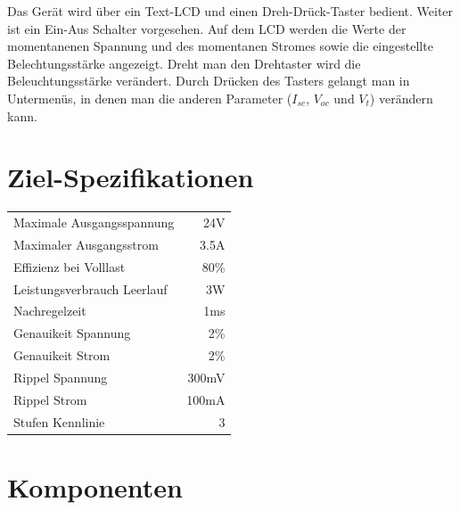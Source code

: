 \documentclass{article}
\begin{document}
Das   Ger\"at  wird   \"uber  ein   Text-LCD  und   einen  Dreh-Dr\"uck-Taster
bedient. Weiter  ist  ein  Ein-Aus  Schalter vorgesehen. Auf  dem  LCD  werden
die  Werte der  momentanenen Spannung  und  des momentanen  Stromes sowie  die
eingestellte Belechtungsst\"arke angezeigt. Dreht man  den Drehtaster wird die
Beleuchtungsst\"arke ver\"andert. Durch  Dr\"ucken des Tasters gelangt  man in
Untermen\"us,  in denen  man  die anderen  Parameter  ($I_{sc}$, $V_{oc}$  und
$V_t$) ver\"andern kann.

\section{Ziel-Spezifikationen}
\begin{center}
\begin{tabular}{lr}
    Maximale Ausgangsspannung	& 24V    \\
    Maximaler Ausgangsstrom		& 3.5A   \\
    Effizienz bei Volllast		& 80\%   \\
    Leistungsverbrauch Leerlauf	& 3W     \\
    Nachregelzeit				& 1ms    \\
    Genauikeit Spannung			& 2\%    \\
    Genauikeit Strom			& 2\%    \\
    Rippel Spannung				& 300mV  \\
    Rippel Strom				& 100mA  \\
    Stufen Kennlinie			& 3      \\
\end{tabular}
\end{center}

\section{Komponenten}
\end{document}
